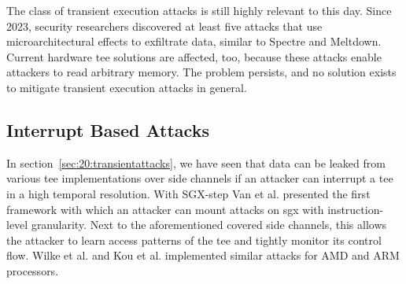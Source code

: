 

The class of transient execution attacks is still highly relevant to this day.
Since 2023, security researchers discovered at least five attacks that use
microarchitectural effects to exfiltrate data, similar to Spectre and Meltdown.
\cite{ormandy2023zenbleed,trujillo2023inception, moghimi2023downfall,ragab_ghostrace_2024, wilke2024tdxdown}
Current hardware \gls{tee} solutions are affected, too, because these attacks
enable attackers to read arbitrary memory. The problem persists, and no solution
exists to mitigate transient execution attacks in general.\\

\subsection{Interrupt Based Attacks}
\label{sec:20:interrupt_sca}
In section~\ref{sec:20:transientattacks}, we have seen that data can be leaked
from various \gls{tee} implementations over side channels if an attacker can
interrupt a \gls{tee} in a high temporal resolution. With SGX-step Van et al.
presented the first framework with which an attacker can mount attacks on
\gls{sgx} with instruction-level granularity.\cite{van2017sgx} Next to the
aforementioned covered side channels, this allows the attacker to learn access
patterns of the \gls{tee} and tightly monitor its control flow. Wilke et al. and
Kou et al. implemented similar attacks for AMD and ARM
processors.\cite{wilke2023sev, kou2021load}\\

